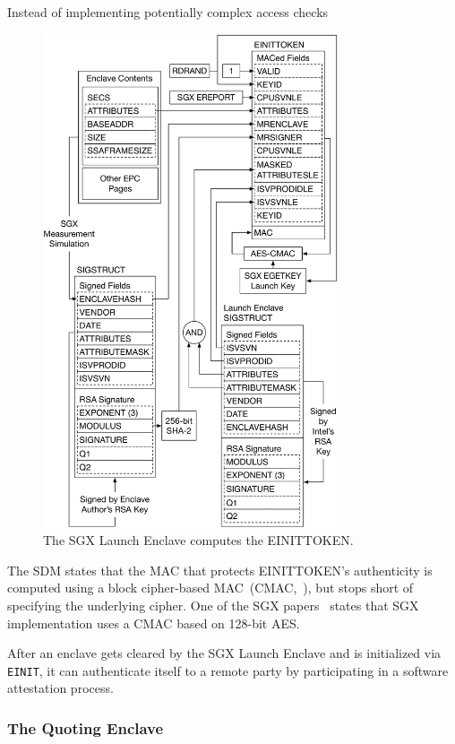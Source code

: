 Instead of implementing potentially complex access checks


\begin{figure}[hbt]
  \centering
  \includegraphics[width=87mm]{figures/sgx_einittoken.pdf}
  \caption{
    The SGX Launch Enclave computes the EINITTOKEN.
  }
  \label{fig:sgx_einittoken}
\end{figure}

The SDM states that the MAC that protects EINITTOKEN's authenticity is computed
using a block cipher-based MAC~(CMAC,~\cite{fips2005cmac}), but stops short of
specifying the underlying cipher. One of the SGX papers~\cite{anati2013sgx}
states that SGX implementation uses a CMAC based on 128-bit AES.




After an enclave gets cleared by the SGX Launch Enclave and is initialized via
\texttt{EINIT}, it can authenticate itself to a remote party by participating
in a software attestation process.


\subsubsection{The Quoting Enclave}
\label{sec:sgx_quoting_enclave}

